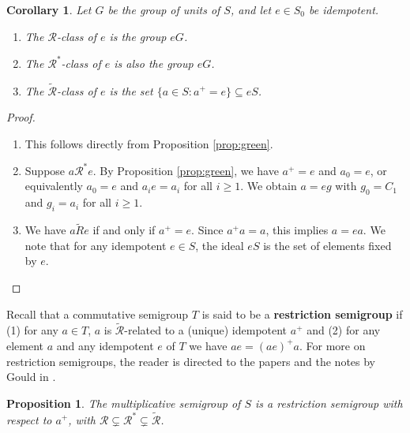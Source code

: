 \documentclass[a4paper, 11pt]{article}
\theoremstyle{plain}
\newtheorem{corollary}  [theorem]{Corollary}
\newtheorem{proposition}[theorem]{Proposition}
\theoremstyle{definition}
\newcommand{\Define}    [1] {\textbf{#1}}
\begin{document}
\begin{corollary} \label{corollary:Extended_Green_e}
Let $G$ be the group of units of $S$, and let $e \in S_0$ be idempotent.
\begin{enumerate}
    \item \label{item:R_e}
    The $\mathcal{R}$-class of $e$ is the group $eG$.

    \item \label{item:R_star_e}
    The $\mathcal{R}^*$-class of $e$ is also the group $eG$.


    \item \label{item:R_tilde_e}
    The $\tilde{\mathcal{R}}$-class of $e$ is the set $\{ a \in S : a^+ = e\} \subseteq eS$.

\end{enumerate}
\end{corollary}

\begin{proof}
\begin{enumerate}
    \item \label{item:proof_R_e}
    This follows directly from Proposition \ref{prop:green}.

    \item \label{item:proof_R_star_e}
    Suppose $a \mathcal{R}^* e$. By Proposition \ref{prop:green}, we have $a^+ = e$ and $a_0 = e$, or equivalently $a_0 = e$ and $a_i e = a_i$ for all $i \ge 1$. We obtain $a = eg$ with $g_0 = C_1$ and $g_i = a_i$ for all $i \ge 1$.


    \item \label{item:proof_R_tilde_e}
    We have $a \tilde{R} e$ if and only if $a^+ = e$. Since $a^+ a = a$, this implies $a = ea$.
We note that for any idempotent $e \in S$, the ideal $eS$ is the set of elements fixed by $e$.
\end{enumerate}

\end{proof}


Recall that a commutative semigroup $T$ is said to be a \Define{restriction semigroup} if (1) for any
$a \in T$, $a$  is $\tilde{\mathcal{R}}$-related to a (unique) idempotent $a^+$ and (2) for any element $a$ and any idempotent $e$ of $T$ we have $ae = (ae)^+ a$. For more on restriction semigroups, the reader is directed to the papers \cite{GH10, Kud25} and the notes by Gould in \cite{Gou07}.


\begin{proposition} \label{proposition:restriction_semigroup}
The multiplicative semigroup of $S$ is a restriction semigroup with respect to $a^+$, with $\mathcal{R} \subsetneq {\mathcal{R}}^* \subsetneq \tilde{\mathcal{R}}$.
\end{proposition}
\end{document}
